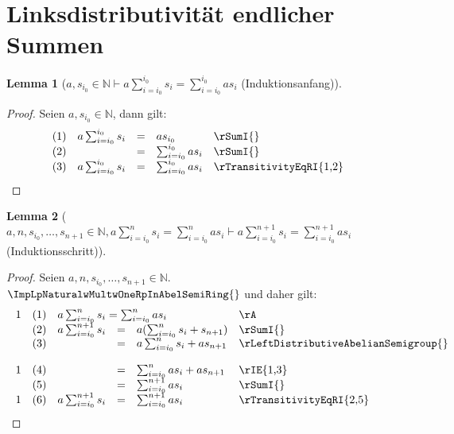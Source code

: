 \documentclass{book}
\theoremstyle{plain}
\newtheorem*{lemma}{Lemma}
\theoremstyle{remark}
\theoremstyle{definition}
\begin{document}
\section{Linksdistributivität endlicher Summen}

\label{awsSubLbiSubZeroRbInNaturalImpaSumSubLbiEqualsiSubZeroRbPowerLbiSubZeroRbsSubiEqualsSumSubLbiEqualsiSubZeroRbPowerLbiSubZeroRbasSubi}
\begin{lemma}[\(a,s_{i_0}\in\mathbb{N}\vdash a\sum_{i=i_0}^{i_0} s_i=\sum_{i=i_0}^{i_0} as_i\) (Induktionsanfang)]
\end{lemma}
\begin{proof}
    Seien \(a,s_{i_0}\in\mathbb{N}\), dann gilt:
    \[
	\begin{array}{llcll p{5cm}}
              &  (1)  & a\sum_{i=i_0}^{i_0} s_i &=& as_{i_0} & \rSumI{} \\
              &  (2)  &  &=& \sum_{i=i_0}^{i_0} as_i & \rSumI{} \\
              &  (3)  &  a\sum_{i=i_0}^{i_0} s_i&=& \sum_{i=i_0}^{i_0} as_i & \rTransitivityEqRI{1,2} \\
        \end{array}
    \]
\end{proof}

\label{awnwsSubLbiSubZeroRbwDotswsSubLbnPlusOneRbInNaturalwaSumSubLbiEqualsiSubZeroRbPowerLbnRbsSubiEqualsSumSubLbiEqualsiSubZeroRbPowerLbnRbasSubiImpaSumSubLbiEqualsiSubZeroRbPowerLbnPlusOneRbsSubiEqualsSumSubLbiEqualsiSubZeroRbPowerLbnPlusOneRbasSubi}
\begin{lemma}[\(a,n,s_{i_0},\dots,s_{n+1}\in\mathbb{N},a\sum_{i=i_0}^{n} s_i=\sum_{i=i_0}^{n} as_i\vdash a\sum_{i=i_0}^{n+1} s_i=\sum_{i=i_0}^{n+1} as_i\) (Induktionsschritt)]
\end{lemma}
\begin{proof}
    Seien \(a,n,s_{i_0},\dots,s_{n+1}\in\mathbb{N}\). \(\ImpLpNaturalwMultwOneRpInAbelSemiRing{}\) und daher gilt:
    \[
	\begin{array}{llcll p{5cm}}
            1 &  (1)  & \multicolumn{3}{l}{a\sum_{i=i_0}^{n} s_i=\sum_{i=i_0}^{n} as_i} & \rA \\
              &  (2)  & a\sum_{i=i_0}^{n+1} s_i &=& a(\sum_{i=i_0}^{n} s_i+s_{n+1}) & \rSumI{} \\
              &  (3)  &  &=& a\sum_{i=i_0}^{n} s_i+as_{n+1} & \rLeftDistributiveAbelianSemigroup{} \\
            1 &  (4)  &  &=& \sum_{i=i_0}^{n} as_i+as_{n+1} & \rIE{1,3} \\
              &  (5)  &  &=& \sum_{i=i_0}^{n+1} as_i & \rSumI{} \\
            1 &  (6)  & a\sum_{i=i_0}^{n+1} s_i &=& \sum_{i=i_0}^{n+1} as_i & \rTransitivityEqRI{2,5} \\
        \end{array}
    \]
\end{proof}
\end{document}
